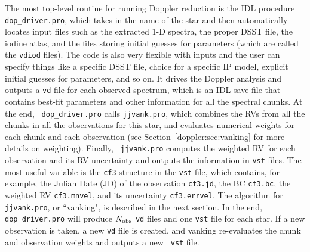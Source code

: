 The most top-level routine for running Doppler reduction is the IDL
procedure {\tt dop\_driver.pro}, which takes in the name of the star
and then automatically locates input files such as the extracted 1-D
spectra, the proper DSST file, the iodine atlas, and the files storing
initial guesses for parameters (which are called the {\tt vdiod}
files). The code is also very flexible with inputs and the user can
specify things like a specific DSST file, choice for a
specific IP model, explicit initial guesses for parameters, and so
on. It drives the Doppler analysis and outputs a {\tt vd} file for each
observed spectrum, which is an IDL save file that contains best-fit parameters and other
information for all the spectral chunks. At the end, {\tt
  dop\_driver.pro} calls {\tt jjvank.pro}, which combines the RVs from
all the chunks in all the observations for this star, and evaluates
numerical weights for each chunk and each observation (see
Section~\ref{doppler:sec:vanking} for more details on weighting). Finally, {\tt
  jjvank.pro} computes the weighted RV for each observation and its RV
uncertainty and outputs the information in {\tt vst} files. The most
useful variable is the {\tt cf3} structure in the {\tt vst} file,
which contains, for example, the Julian Date (JD) of the observation
{\tt cf3.jd}, the BC {\tt cf3.bc}, the weighted RV {\tt cf3.mnvel},
and its uncertainty {\tt cf3.errvel}. The algorithm for {\tt
  jjvank.pro}, or ``vanking", is described in the next
section. In the end, {\tt dop\_driver.pro} will produce $N_{\rm obs}$
{\tt vd} files and one {\tt vst} file for each star. If a new
observation is taken, a new {\tt vd} file is created, and vanking
re-evaluates the chunk and observation weights and outputs a new {\tt
  vst} file.

